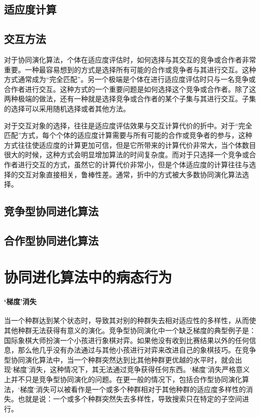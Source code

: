 \documentclass[a4paper]{article}
\begin{document}
    \subsection{适应度计算}
    
    \subsection{交互方法}
    
    对于协同演化算法，个体在适应度评估时，如何选择与其交互的竞争或合作者非常重要。一种最容易想到的方式是选择所有可能的合作或竞争者与其进行交互。这种方式通常成为“完全匹配”。另一个极端是个体在进行适应度评估时只与一名竞争或合作者进行交互。这种方式的一个重要问题是如何选择这个竞争或合作者。除了这两种极端的做法，还有一种就是选择竞争或合作者的某个子集与其进行交互。子集的选择可以采用随机选择或者其他方法。

    对于交互对象的选择，往往是适应度评估效果与交互计算代价的折中。对于“完全匹配”方式，每个个体的适应度计算需要与所有可能的合作或竞争者的参与，这种方式往往使适应度的计算更加可信，但是它所带来的计算代价非常大，当个体数目很大的时候，这种方式会明显增加算法的时间复杂度。而对于只选择一个竞争或合作者进行交互的方式，虽然它的计算代价非常小，但是个体适应度的计算往往与选择的交互对象直接相关，鲁棒性差。通常，折中的方式被大多数协同演化算法选择。


    \subsection{竞争型协同进化算法}

    \subsection{合作型协同进化算法}

    \newpage
    \section{协同进化算法中的病态行为}

    \paragraph{‘梯度’消失}

    当一个种群达到某个状态时，导致其对别的种群失去相对适应性的多样性，从而使其他种群无法获得有意义的演化。竞争型协同演化中一个缺乏梯度的典型例子是：国际象棋大师扮演一个小孩进行象棋对弈。如果他没有收到比赛结果以外的任何信息，那么他几乎没有办法通过与其他小孩进行对弈来改进自己的象棋技巧。在竞争型协同演化算法中，当一个种群突然达到比其他种群更优越的水平时，就会出现‘梯度’消失，这种情况下，其无法通过竞争获得任何东西。‘梯度’消失严格意义上并不只是竞争型协同演化的问题。在更一般的情况下，包括合作型协同演化算法，‘梯度‘消失可以被看作是一个或多个种群相对于其他种群的适应度多样性的消失。也就是说：一个或多个种群突然失去多样性，导致搜索只在特定的子空间进行。
\end{document}
